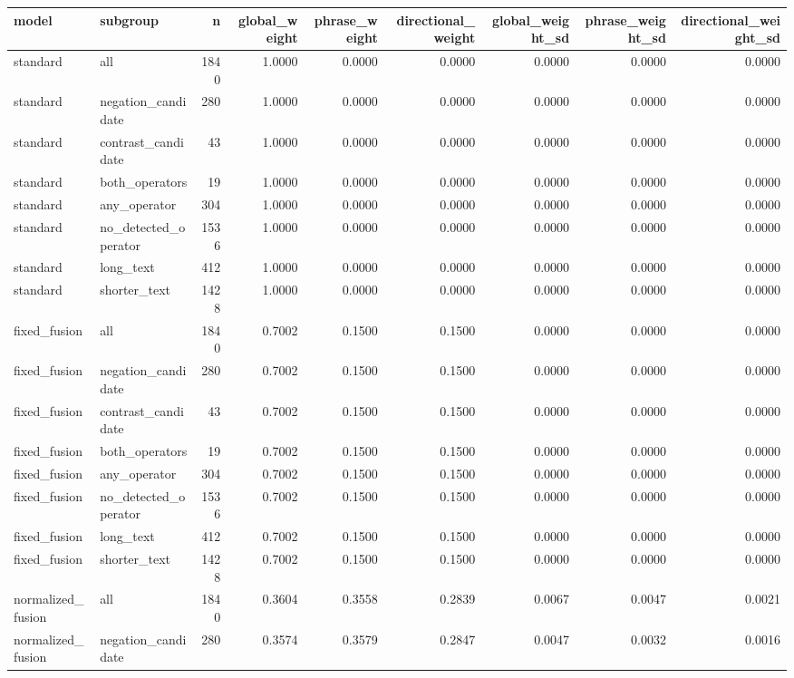 \begin{tabular}{llrrrrrrr}
\toprule
model & subgroup & n & global_weight & phrase_weight & directional_weight & global_weight_sd & phrase_weight_sd & directional_weight_sd \\
\midrule
standard & all & 1840 & 1.0000 & 0.0000 & 0.0000 & 0.0000 & 0.0000 & 0.0000 \\
standard & negation_candidate & 280 & 1.0000 & 0.0000 & 0.0000 & 0.0000 & 0.0000 & 0.0000 \\
standard & contrast_candidate & 43 & 1.0000 & 0.0000 & 0.0000 & 0.0000 & 0.0000 & 0.0000 \\
standard & both_operators & 19 & 1.0000 & 0.0000 & 0.0000 & 0.0000 & 0.0000 & 0.0000 \\
standard & any_operator & 304 & 1.0000 & 0.0000 & 0.0000 & 0.0000 & 0.0000 & 0.0000 \\
standard & no_detected_operator & 1536 & 1.0000 & 0.0000 & 0.0000 & 0.0000 & 0.0000 & 0.0000 \\
standard & long_text & 412 & 1.0000 & 0.0000 & 0.0000 & 0.0000 & 0.0000 & 0.0000 \\
standard & shorter_text & 1428 & 1.0000 & 0.0000 & 0.0000 & 0.0000 & 0.0000 & 0.0000 \\
fixed_fusion & all & 1840 & 0.7002 & 0.1500 & 0.1500 & 0.0000 & 0.0000 & 0.0000 \\
fixed_fusion & negation_candidate & 280 & 0.7002 & 0.1500 & 0.1500 & 0.0000 & 0.0000 & 0.0000 \\
fixed_fusion & contrast_candidate & 43 & 0.7002 & 0.1500 & 0.1500 & 0.0000 & 0.0000 & 0.0000 \\
fixed_fusion & both_operators & 19 & 0.7002 & 0.1500 & 0.1500 & 0.0000 & 0.0000 & 0.0000 \\
fixed_fusion & any_operator & 304 & 0.7002 & 0.1500 & 0.1500 & 0.0000 & 0.0000 & 0.0000 \\
fixed_fusion & no_detected_operator & 1536 & 0.7002 & 0.1500 & 0.1500 & 0.0000 & 0.0000 & 0.0000 \\
fixed_fusion & long_text & 412 & 0.7002 & 0.1500 & 0.1500 & 0.0000 & 0.0000 & 0.0000 \\
fixed_fusion & shorter_text & 1428 & 0.7002 & 0.1500 & 0.1500 & 0.0000 & 0.0000 & 0.0000 \\
normalized_fusion & all & 1840 & 0.3604 & 0.3558 & 0.2839 & 0.0067 & 0.0047 & 0.0021 \\
normalized_fusion & negation_candidate & 280 & 0.3574 & 0.3579 & 0.2847 & 0.0047 & 0.0032 & 0.0016 \\

\end{tabular}
